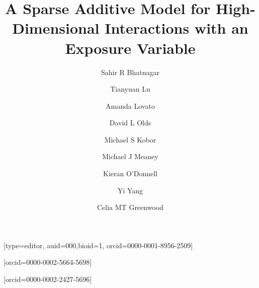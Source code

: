 \documentclass[a4paper,fleqn]{cas-sc}
\begin{document}
\let\WriteBookmarks\relax
\def\floatpagepagefraction{1}
\def\textpagefraction{.001}

\title [mode = title]{A Sparse Additive Model for High-Dimensional Interactions with an Exposure Variable}                      





\author[1,2]{Sahir R Bhatnagar}[type=editor,
                        auid=000,bioid=1,
                        orcid=0000-0001-8956-2509]
\cormark[1]


\author[3,4]{Tianyuan Lu}[orcid=0000-0002-5664-5698]
\author[5]{Amanda Lovato}
\author[6]{David L Olds}
\author[7]{Michael S Kobor}
\author[8]{Michael J Meaney}
\author[9]{Kieran O'Donnell} 
\author[10]{Yi Yang} 
\author[1,3,5]{Celia MT Greenwood}[orcid=0000-0002-2427-5696]

\address[1]{Department of Epidemiology, Biostatistics and Occupational Health, McGill University, Montr\'{e}al, Canada}
\address[2]{Department of Diagnostic Radiology, McGill University, Montr\'{e}al, Canada}
\address[3]{Quantitative Life Sciences, McGill University}
\address[4]{Lady Davis Institute, Jewish General Hospital, Montr\'{e}al, QC} \address[5]{Statistics Canada, Ottawa, ON}
\address[6]{Department of Pediatrics, University of Colorado School of Medicine, Denver} \address[7]{Department of Medical Genetics, University of British Columbia, BC} \address[8]{Singapore Institute for Clinical Sciences, Singapore; McGill University} \address[9]{Department of Psychiatry, McGill University}
\address[10]{Department of Mathematics and Statistics, McGill University} 
\address[11]{Departments of Oncology and Human Genetics, McGill University}
\end{document}
